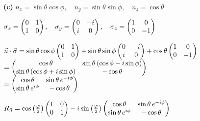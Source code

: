 \documentclass[14pt]{extarticle}
\makeatletter
\newenvironment{lefteqs}{%
    \begin{flushleft}%
    \renewcommand{\arraystretch}{1.3}%
    $\begin{array}{@{}l@{}}%
}{%
    \end{array}$%
    \end{flushleft}%
}
\makeatother
\begin{document}
\textbf{(c)} \quad $n_x = \sin\theta \cos\phi, \quad n_y = \sin\theta \sin\phi, \quad n_z = \cos\theta$
\begin{lefteqs}
    \sigma_x = \begin{pmatrix} 0 & 1 \\ 1 & 0 \end{pmatrix}, \quad
    \sigma_y = \begin{pmatrix} 0 & -i \\ i & 0 \end{pmatrix}, \quad
    \sigma_z = \begin{pmatrix} 1 & 0 \\ 0 & -1 \end{pmatrix}
\end{lefteqs}
\begin{lefteqs}
    \vec{n} \cdot \vec{\sigma} = \sin\theta \cos\phi \begin{pmatrix} 0 & 1 \\ 1 & 0 \end{pmatrix}
    + \sin\theta \sin\phi \begin{pmatrix} 0 & -i \\ i & 0 \end{pmatrix}
    + \cos\theta \begin{pmatrix} 1 & 0 \\ 0 & -1 \end{pmatrix} \\
    = \begin{pmatrix} \cos\theta & \sin\theta \left( \cos\phi - i \sin\phi \right) \\ \sin\theta \left( \cos\phi + i \sin\phi \right) & -\cos\theta \end{pmatrix} \\
    = \begin{pmatrix} \cos\theta & \sin\theta \, e^{-i\phi} \\ \sin\theta \, e^{i\phi} & -\cos\theta \end{pmatrix}
\end{lefteqs}
\begin{lefteqs}
    R_{\vec{n}} = \cos\left(\frac{\varphi}{2}\right) \begin{pmatrix} 1 & 0 \\ 0 & 1 \end{pmatrix}
    - i \sin\left(\frac{\varphi}{2}\right) \begin{pmatrix} \cos\theta & \sin\theta \, e^{-i\phi} \\ \sin\theta \, e^{i\phi} & -\cos\theta \end{pmatrix}
\end{lefteqs}
\end{document}
